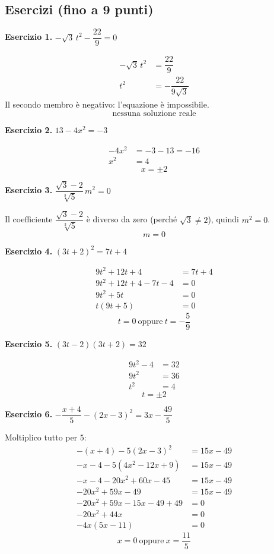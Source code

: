 \documentclass[11pt]{report}
\newcommand{\eserc}[1]{\bigskip\noindent\textbf{Esercizio #1.}\quad}
\begin{document}
\subsection*{Esercizi (fino a 9 punti)}

\eserc{1} $-\sqrt3\,t^2-\dfrac{22}{9}=0$

\begin{align*}
-\sqrt3\,t^2 &= \dfrac{22}{9}\\
t^2 &= -\dfrac{22}{9\sqrt3}
\end{align*}
Il secondo membro è negativo: l'equazione è impossibile.
\[
\boxed{\text{nessuna soluzione reale}}
\]

\eserc{2} $13-4x^2=-3$

\begin{align*}
-4x^2 &= -3-13=-16\\
x^2 &= 4
\end{align*}
\[
\boxed{x=\pm2}
\]

\eserc{3} $\dfrac{\sqrt3-2}{\sqrt[3]5}\,m^2=0$

Il coefficiente $\dfrac{\sqrt3-2}{\sqrt[3]5}$ è diverso da zero (perché $\sqrt3\neq2$), quindi $m^2=0$.
\[
\boxed{m=0}
\]

\eserc{4} $(3t+2)^2=7t+4$

\begin{align*}
9t^2+12t+4 &= 7t+4\\
9t^2+12t+4-7t-4 &=0\\
9t^2+5t &=0\\
t(9t+5)&=0
\end{align*}
\[
\boxed{t=0 \ \text{oppure}\ t=-\dfrac59}
\]

\eserc{5} $(3t-2)(3t+2)=32$

\begin{align*}
9t^2-4 &= 32\\
9t^2 &= 36\\
t^2 &= 4
\end{align*}
\[
\boxed{t=\pm2}
\]

\eserc{6} $-\dfrac{x+4}{5} - (2x-3)^2 = 3x - \dfrac{49}{5}$

Moltiplico tutto per $5$:
\begin{align*}
-(x+4) - 5(2x-3)^2 &= 15x-49\\
-x-4-5(4x^2-12x+9) &= 15x-49\\
-x-4-20x^2+60x-45 &= 15x-49\\
-20x^2+59x-49 &= 15x-49\\
-20x^2+59x-15x-49+49 &=0\\
-20x^2+44x &=0\\
-4x(5x-11)&=0
\end{align*}
\[
\boxed{x=0 \ \text{oppure}\ x=\dfrac{11}{5}}
\]
\end{document}
